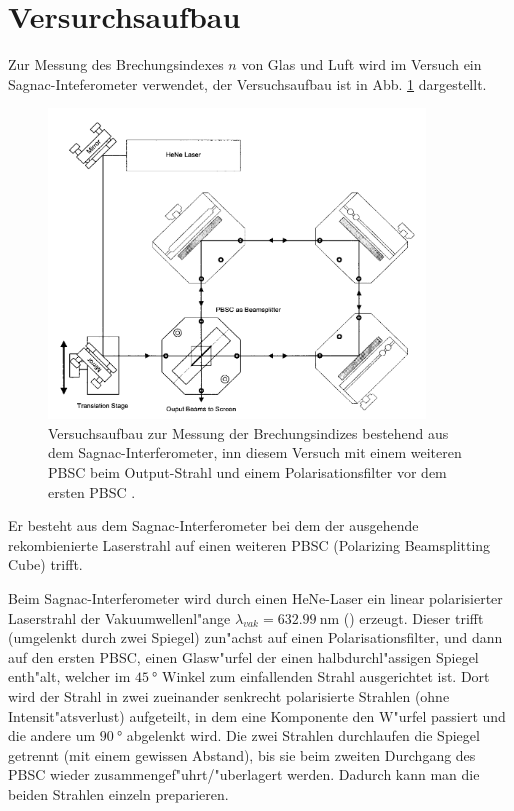 \section{Versurchsaufbau}
  \label{sec:Durchführung}
  Zur Messung des Brechungsindexes $n$ von Glas und Luft wird im Versuch ein Sagnac-Inteferometer verwendet, der Versuchsaufbau ist in Abb. \ref{fig:aufbau} dargestellt.
  \begin{figure}[H]
    \centering
    \includegraphics[width=10cm]{bilder/sagnac-interferometer,aufbau2.png}
    \caption{Versuchsaufbau zur Messung der Brechungsindizes bestehend aus dem Sagnac-Interferometer, inn diesem Versuch mit einem weiteren PBSC beim Output-Strahl und einem Polarisationsfilter vor dem ersten PBSC \cite{Anleitung}.}
    \label{fig:aufbau}
  \end{figure}
  Er besteht aus dem Sagnac-Interferometer bei dem der ausgehende rekombienierte Laserstrahl auf einen weiteren PBSC (Polarizing Beamsplitting Cube) trifft.

  Beim Sagnac-Interferometer wird durch einen HeNe-Laser ein linear polarisierter Laserstrahl der Vakuumwellenl"ange $\lambda_{vak}=\SI{632,99}{\nano \meter}$ (\cite{Anleitung}) erzeugt.
  Dieser trifft (umgelenkt durch zwei Spiegel) zun"achst auf einen Polarisationsfilter, und dann auf den ersten PBSC, einen Glasw"urfel der einen halbdurchl"assigen Spiegel enth"alt, welcher im $\SI{45}{\degree}$ Winkel zum einfallenden Strahl ausgerichtet ist.
  Dort wird der Strahl in zwei zueinander senkrecht polarisierte Strahlen (ohne Intensit"atsverlust) aufgeteilt, in dem eine Komponente den W"urfel passiert und die andere um $\SI{90}{\degree}$ abgelenkt wird.
  Die zwei Strahlen durchlaufen die Spiegel getrennt (mit einem gewissen Abstand), bis sie beim zweiten Durchgang des PBSC wieder zusammengef"uhrt/"uberlagert werden.
  Dadurch kann man die beiden Strahlen einzeln preparieren.


